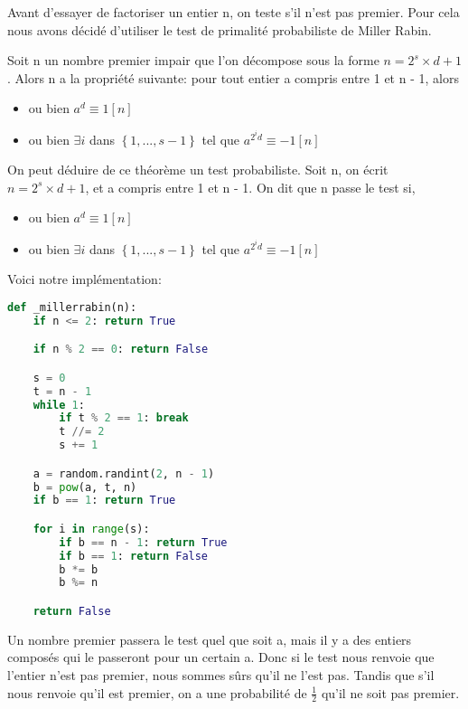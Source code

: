 Avant d'essayer de factoriser un entier n, on teste s'il n'est pas premier. 
Pour cela nous avons décidé d'utiliser le test de primalité probabiliste de Miller Rabin.

\begin{theorem}
    Soit n un nombre premier impair que l'on décompose sous la forme $n = 2^s \times d + 1$. 
    Alors n a la propriété suivante: pour tout entier a compris entre 1 et n - 1, alors
    \begin{itemize}
        \item ou bien $a^d \equiv 1 [n]$
        \item ou bien $\exists i$ dans $\left\{1, ..., s - 1\right\}$ tel que $a^{2^i d} \equiv -1 [n]$
    \end{itemize}
\end{theorem}

On peut déduire de ce théorème un test probabiliste.
Soit n, on écrit $n = 2^s \times d + 1$, et a compris entre 1 et n - 1.
On dit que n passe le test si,
    \begin{itemize}
        \item ou bien $a^d \equiv 1 [n]$
        \item ou bien $\exists i$ dans $\left\{1, ..., s - 1\right\}$ tel que $a^{2^i d} \equiv -1 [n]$
    \end{itemize}

Voici notre implémentation:
\begin{lstlisting}[language=Python]
def _millerrabin(n):
    if n <= 2: return True

    if n % 2 == 0: return False

    s = 0
    t = n - 1
    while 1:
        if t % 2 == 1: break
        t //= 2
        s += 1

    a = random.randint(2, n - 1)
    b = pow(a, t, n)
    if b == 1: return True

    for i in range(s):
        if b == n - 1: return True
        if b == 1: return False
        b *= b
        b %= n

    return False
\end{lstlisting}
\vspace{1em}
Un nombre premier passera le test quel que soit a, mais il y a des entiers composés qui le passeront pour un certain a. 
Donc si le test nous renvoie que l'entier n'est pas premier, nous sommes sûrs qu'il ne l'est pas. 
Tandis que s'il nous renvoie qu'il est premier, on a une probabilité de $\frac{1}{2}$ qu'il ne soit pas premier. \\

